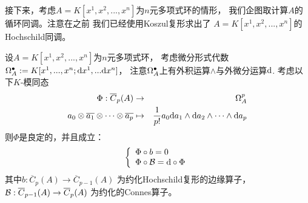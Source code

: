 
接下来，考虑$A=K[x^1,x^2,...,x^n]$为$n$元多项式环的情形，
我们企图取计算$A$的循环同调。注意在之前
我们已经使用Koszul复形求出了
$A=K[x^1,x^2,...,x^n]$的Hochschild同调。

\begin{lemma}设$A=K[x^1,x^2,...,x^n]$为$n$元多项式环，
考虑微分形式代数$\Omega_A^{\bullet}:=K[x^1,...,x^n;\mathrm{d} x^1,...\mathrm{d} x^n]$，
注意$\Omega_A^{\bullet}$上有外积运算$\wedge$与外微分运算$\mathrm{d}$.
考虑以下$K$-模同态
\begin{eqnarray*}
\Phi:\overline{C}_p(A)&\to& \Omega^p_A\\
a_0\otimes\overline{a_1}\otimes\cdots\otimes\overline{a_p}
&\mapsto& \frac{1}{p!}
a_0\mathrm{d} a_1\wedge\mathrm{d} a_2\wedge\cdots\wedge\mathrm{d} a_p
\end{eqnarray*}
则$\Phi$是良定的，并且成立：
$$
  \left\{
    \begin{array}{l}
       \Phi\circ b=0\\
       \Phi\circ\mathcal{B}=\mathrm{d}\circ\Phi
    \end{array}
  \right.
$$
其中$b:\overline{C}_p(A)\to\overline{C}_{p-1}(A)$
为约化Hochschild复形的边缘算子，
$\mathcal{B}:\overline{C}_{p-1}(A)\to\overline{C}_{p}(A)$
为约化的Connes算子。
\label{Hochschild-Konstant-Rosenberg算子-lemma}
\end{lemma}

